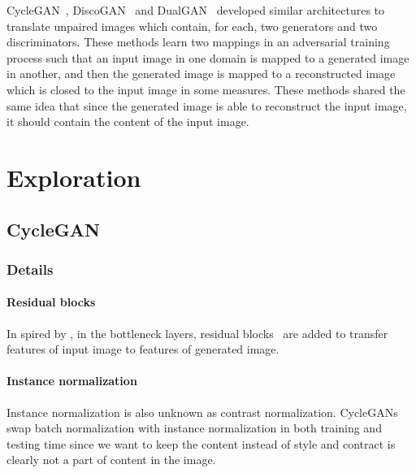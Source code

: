 CycleGAN~\cite{CycleGAN}, DiscoGAN~\cite{DiscoGAN} and DualGAN~\cite{DualGAN} developed similar architectures to translate unpaired images which contain, for each, two generators and two discriminators. These methods learn two mappings in an adversarial training process such that an input image in one domain is mapped to a generated image in another, and then the generated image is mapped to a reconstructed image which is closed to the input image in some measures. These methods shared the same idea that since the generated image is able to reconstruct the input image, it should contain the content of the input image.

\section{Exploration}
\subsection{CycleGAN}
\subsubsection{Details}
\paragraph{Residual blocks}
In spired by \cite{Johnson et. al.}, in the bottleneck layers, residual blocks~\cite{ResNets} are added to transfer features of input image to features of generated image. 
\paragraph{Instance normalization}
Instance normalization is also unknown as contrast normalization. CycleGANs swap batch normalization with instance normalization in both training and testing time since we want to keep the content instead of style and contract is clearly not a part of content in the image.

